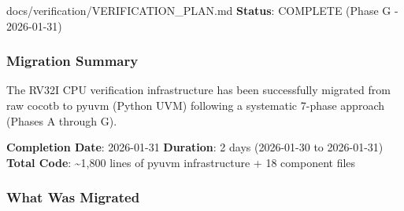 \begin{relocated}{docs/verification/VERIFICATION_PLAN.md}
\textbf{Status}: \ok{} COMPLETE (Phase G - 2026-01-31)

\subsubsection{Migration Summary}\label{ds:ch:verification-plan:migration-summary}

The RV32I CPU verification infrastructure has been successfully migrated
from raw cocotb to pyuvm (Python UVM) following a systematic 7-phase
approach (Phases A through G).

\textbf{Completion Date}: 2026-01-31 \textbf{Duration}: 2 days
(2026-01-30 to 2026-01-31) \textbf{Total Code}: \textasciitilde1,800
lines of pyuvm infrastructure + 18 component files

\subsubsection{What Was Migrated}\label{ds:ch:verification-plan:what-was-migrated}


\end{relocated}
